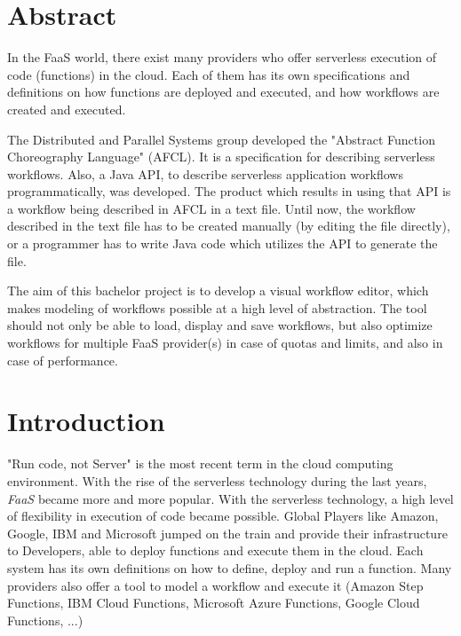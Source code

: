 \documentclass[a4paper,11pt,pdftex,halfparskip,cleardoubleempty,bibtotoc,liststotoc]{scrbook}
\begin{document}


\cleardoublepage



\cleardoublepage

\pagestyle{plain}

\chapter*{Abstract}
In the FaaS world, there exist many providers who offer serverless execution of code (functions) in the cloud. Each of them has its own specifications and definitions on how functions are deployed and executed, and how workflows are created and executed.
\par
The Distributed and Parallel Systems group developed the "Abstract Function Choreography Language" (AFCL). It is a specification for describing serverless workflows. Also, a Java API, to describe serverless application workflows programmatically, was developed.
The product which results in using that API is a workflow being described in AFCL in a text file.
Until now, the workflow described in the text file has to be created manually (by editing the file directly), or a programmer has to write Java code which utilizes the API to generate the file.
\par
The aim of this bachelor project is to develop a visual workflow editor, which makes modeling of workflows possible at a high level of abstraction. The tool should not only be able to load, display and save workflows, but also optimize workflows for multiple FaaS provider(s) in case of quotas and limits, and also in case of performance.

\cleardoublepage

\tableofcontents

\newpage

\chapter{Introduction}
"Run code, not Server" is the most recent term in the cloud computing environment.
With the rise of the serverless technology during the last years, \emph{FaaS} became more and more popular.
With the serverless technology, a high level of flexibility in execution of code became possible. Global Players like Amazon, Google, IBM and Microsoft jumped on the train and provide their infrastructure to Developers, able to deploy functions and execute them in the cloud. Each system has its own definitions on how to define, deploy and run a function. Many providers also offer a tool to model a workflow and execute it (Amazon Step Functions, IBM Cloud Functions, Microsoft Azure Functions, Google Cloud Functions, ...)
\end{document}
